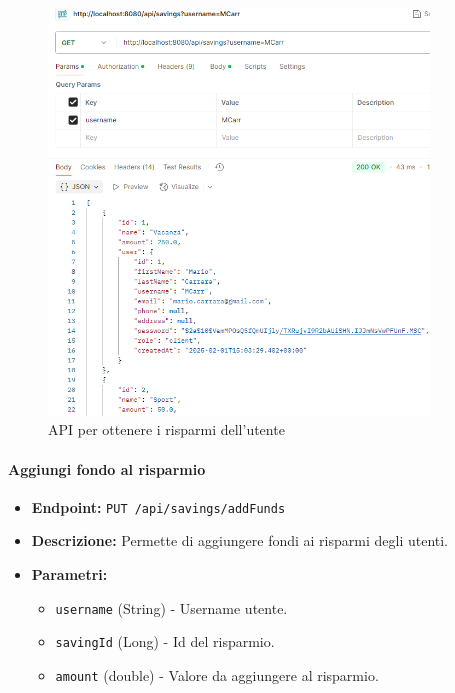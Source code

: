 \begin{figure}[H]
    \centering
    \includegraphics[width=0.9\textwidth]{images/GetSavingsAPI.png}
    \caption{API per ottenere i risparmi dell'utente}
    \label{fig: GetSavingAPI}
\end{figure}

\paragraph{Aggiungi fondo al risparmio} 

\begin{itemize}
    \item \textbf{Endpoint:} \texttt{PUT /api/savings/addFunds}
    \item \textbf{Descrizione:} Permette di aggiungere fondi ai risparmi degli utenti.
    \item \textbf{Parametri:}
    \begin{itemize}
        \item \texttt{username} (String) - Username utente.
        \item \texttt{savingId} (Long) - Id del risparmio.
        \item \texttt{amount} (double) - Valore da aggiungere al risparmio.
    \end{itemize}
\end{itemize}

